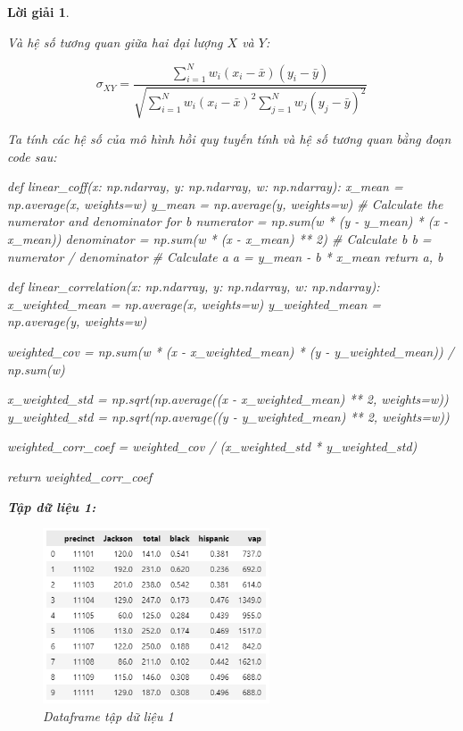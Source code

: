 \documentclass[14pt, a4paper]{article}
\theoremstyle{sltheorem}
\theoremstyle{soltheorem}
\newtheorem*{loigiai}{Lời giải}
\begin{document}
\begin{loigiai}
\begin{enumerate}
        Và hệ số tương quan giữa hai đại lượng $X$ và $Y$:

        \begin{equation*}
            \sigma_{XY} = \dfrac{\sum_{i=1}^N w_i (x_i - \bar{x})(y_i - \bar{y})}{\sqrt{\sum_{i=1}^N w_i (x_i - \bar{x})^2 \sum_{j=1}^N w_j (y_j - \bar{y})^2}}
        \end{equation*}

        Ta tính các hệ số của mô hình hồi quy tuyến tính và hệ số tương quan bằng đoạn code sau:

        \begin{python}
def linear_coff(x: np.ndarray, y: np.ndarray, w: np.ndarray):
    x_mean = np.average(x, weights=w)
    y_mean = np.average(y, weights=w)
    # Calculate the numerator and denominator for b
    numerator = np.sum(w * (y - y_mean) * (x - x_mean))
    denominator = np.sum(w * (x - x_mean) ** 2)
    # Calculate b
    b = numerator / denominator
    # Calculate a
    a = y_mean - b * x_mean
    return a, b
        \end{python}


\begin{python}
def linear_correlation(x: np.ndarray, y: np.ndarray, w: np.ndarray):
    x_weighted_mean = np.average(x, weights=w)
    y_weighted_mean = np.average(y, weights=w)
    
    weighted_cov = np.sum(w * (x - x_weighted_mean) * (y - y_weighted_mean)) / np.sum(w)
    
    x_weighted_std = np.sqrt(np.average((x - x_weighted_mean) ** 2, weights=w))
    y_weighted_std = np.sqrt(np.average((y - y_weighted_mean) ** 2, weights=w))
    
    weighted_corr_coef = weighted_cov / (x_weighted_std * y_weighted_std)
    
    return weighted_corr_coef
\end{python}

    \textbf{Tập dữ liệu 1:}

    \begin{figure}[H]
        \centering
        \includegraphics[width=0.6\textwidth]{figures/primary_df.png}
        \caption{Dataframe tập dữ liệu 1}
        \label{fig:primary_df}
    \end{figure}


\end{enumerate}
\end{loigiai}
\end{document}

